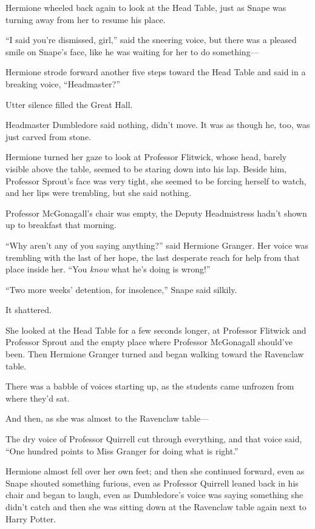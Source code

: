 Hermione wheeled back again to look at the Head Table, just as Snape was
turning away from her to resume his place.

``I said you're dismissed, girl,'' said the sneering voice, but there
was a pleased smile on Snape's face, like he was waiting for her to do
something---

Hermione strode forward another five steps toward the Head Table and
said in a breaking voice, ``Headmaster?''

Utter silence filled the Great Hall.

Headmaster Dumbledore said nothing, didn't move. It was as though he,
too, was just carved from stone.

Hermione turned her gaze to look at Professor Flitwick, whose head,
barely visible above the table, seemed to be staring down into his lap.
Beside him, Professor Sprout's face was very tight, she seemed to be
forcing herself to watch, and her lips were trembling, but she said
nothing.

Professor McGonagall's chair was empty, the Deputy Headmistress hadn't
shown up to breakfast that morning.

``Why aren't any of you saying anything?'' said Hermione Granger. Her
voice was trembling with the last of her hope, the last desperate reach
for help from that place inside her. ``You \emph{know} what he's doing
is wrong!''

``Two more weeks' detention, for insolence,'' Snape said silkily.

It shattered.

She looked at the Head Table for a few seconds longer, at Professor
Flitwick and Professor Sprout and the empty place where Professor
McGonagall should've been. Then Hermione Granger turned and began
walking toward the Ravenclaw table.

There was a babble of voices starting up, as the students came unfrozen
from where they'd sat.

And then, as she was almost to the Ravenclaw table---

The dry voice of Professor Quirrell cut through everything, and that
voice said, ``One hundred points to Miss Granger for doing what is
right.''

Hermione almost fell over her own feet; and then she continued forward,
even as Snape shouted something furious, even as Professor Quirrell
leaned back in his chair and began to laugh, even as Dumbledore's voice
was saying something she didn't catch and then she was sitting down at
the Ravenclaw table again next to Harry Potter.

